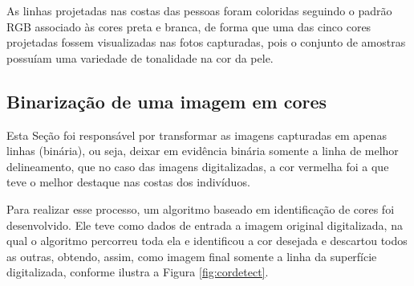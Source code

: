 \documentclass[a4paper, 12pt]{article}
\begin{document}
As linhas projetadas nas costas das pessoas foram coloridas seguindo o padrão RGB \cite{LUKACPLATANIOTIS} associado às cores preta e branca, de forma que uma das cinco cores projetadas fossem visualizadas nas fotos capturadas, pois o conjunto de amostras possuíam uma variedade de tonalidade na cor da pele.

\subsection{Binarização de uma imagem em cores}
\label{subsec:binariza}

Esta Seção foi responsável por transformar as imagens capturadas em apenas linhas (binária), ou seja, deixar em evidência binária somente a linha de melhor delineamento, que no caso das imagens digitalizadas, a cor vermelha foi a que teve o melhor destaque nas costas dos indivíduos.

Para realizar esse processo, um algoritmo baseado em identificação de cores foi desenvolvido. Ele teve como dados de entrada a imagem original digitalizada, na qual o algoritmo percorreu toda ela e identificou a cor desejada e descartou todos as outras, obtendo, assim, como imagem final somente a linha da superfície digitalizada, conforme ilustra a Figura \ref{fig:cordetect}.
\end{document}

